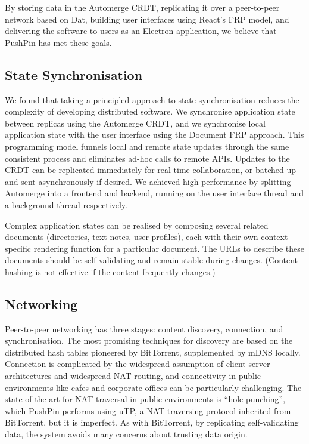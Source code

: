 \documentclass[sigplan,10pt]{acmart}
\begin{document}
By storing data in the Automerge CRDT, replicating it over a peer-to-peer network based on Dat, building user interfaces using React's FRP model, and delivering the software to users as an Electron application, we believe that PushPin has met these goals.

\subsection{State Synchronisation}

We found that taking a principled approach to state synchronisation reduces the complexity of developing distributed software.
We synchronise application state between replicas using the Automerge CRDT, and we synchronise local application state with the user interface using the Document FRP approach. This programming model funnels local and remote state updates through the same consistent process and eliminates ad-hoc calls to remote APIs. Updates to the CRDT can be replicated immediately for real-time collaboration, or batched up and sent asynchronously if desired. We achieved high performance by splitting Automerge into a frontend and backend, running on the user interface thread and a background thread respectively.

Complex application states can be realised by composing several related documents (directories, text notes, user profiles), each with their own context-specific rendering function for a particular document. The URLs to describe these documents should be self-validating and remain stable during changes. (Content hashing is not effective if the content frequently changes.)

\subsection{Networking}

Peer-to-peer networking has three stages: content discovery, connection, and synchronisation. The most promising techniques for discovery are based on the distributed hash tables pioneered by BitTorrent, supplemented by mDNS locally. Connection is complicated by the widespread assumption of client-server architectures and widespread NAT routing, and connectivity in public environments like cafes and corporate offices can be particularly challenging.  The state of the art for NAT traversal in public environments is ``hole punching'', which PushPin performs using uTP, a NAT-traversing protocol inherited from BitTorrent, but it is imperfect. As with BitTorrent, by replicating self-validating data, the system avoids many concerns about trusting data origin.
\end{document}
